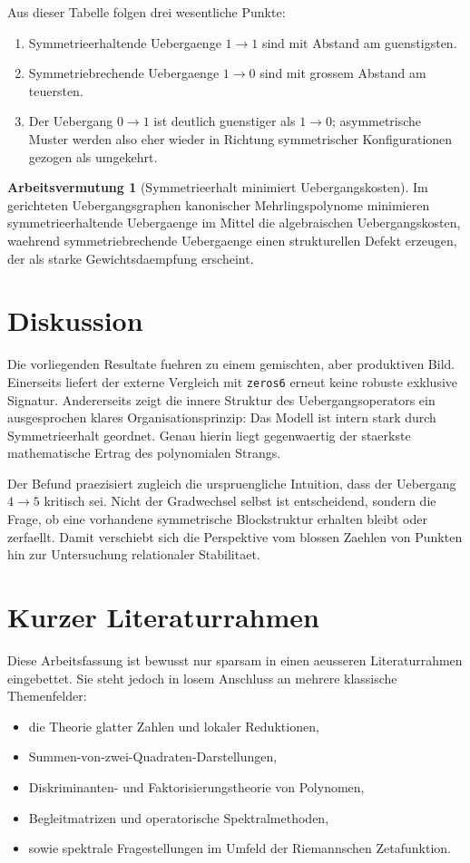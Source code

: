 \documentclass[11pt,a4paper]{article}
\theoremstyle{definition}
\newtheorem{arbeitsvermutung}[satz]{Arbeitsvermutung}
\begin{document}
Aus dieser Tabelle folgen drei wesentliche Punkte:
\begin{enumerate}[leftmargin=2em]
\item Symmetrieerhaltende Uebergaenge \(1\to 1\) sind mit Abstand am guenstigsten.
\item Symmetriebrechende Uebergaenge \(1\to 0\) sind mit grossem Abstand am teuersten.
\item Der Uebergang \(0\to 1\) ist deutlich guenstiger als \(1\to 0\); asymmetrische Muster werden also eher wieder in Richtung symmetrischer Konfigurationen gezogen als umgekehrt.
\end{enumerate}

\begin{arbeitsvermutung}[Symmetrieerhalt minimiert Uebergangskosten]
Im gerichteten Uebergangsgraphen kanonischer Mehrlingspolynome minimieren symmetrieerhaltende Uebergaenge im Mittel die algebraischen Uebergangskosten, waehrend symmetriebrechende Uebergaenge einen strukturellen Defekt erzeugen, der als starke Gewichtsdaempfung erscheint.
\end{arbeitsvermutung}

\section{Diskussion}

Die vorliegenden Resultate fuehren zu einem gemischten, aber produktiven Bild. Einerseits liefert der externe Vergleich mit \texttt{zeros6} erneut keine robuste exklusive Signatur. Andererseits zeigt die innere Struktur des Uebergangsoperators ein ausgesprochen klares Organisationsprinzip: Das Modell ist intern stark durch Symmetrieerhalt geordnet. Genau hierin liegt gegenwaertig der staerkste mathematische Ertrag des polynomialen Strangs.

Der Befund praezisiert zugleich die urspruengliche Intuition, dass der Uebergang \(4\to 5\) kritisch sei. Nicht der Gradwechsel selbst ist entscheidend, sondern die Frage, ob eine vorhandene symmetrische Blockstruktur erhalten bleibt oder zerfaellt. Damit verschiebt sich die Perspektive vom blossen Zaehlen von Punkten hin zur Untersuchung relationaler Stabilitaet.

\section{Kurzer Literaturrahmen}

Diese Arbeitsfassung ist bewusst nur sparsam in einen aeusseren Literaturrahmen eingebettet. Sie steht jedoch in losem Anschluss an mehrere klassische Themenfelder:
\begin{itemize}[leftmargin=2em]
\item die Theorie glatter Zahlen und lokaler Reduktionen,
\item Summen-von-zwei-Quadraten-Darstellungen,
\item Diskriminanten- und Faktorisierungstheorie von Polynomen,
\item Begleitmatrizen und operatorische Spektralmethoden,
\item sowie spektrale Fragestellungen im Umfeld der Riemannschen Zetafunktion.
\end{itemize}
\end{document}
